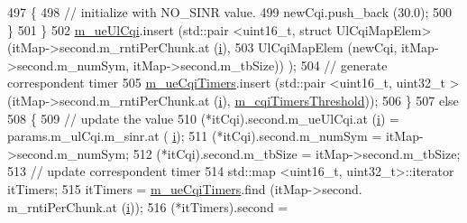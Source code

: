 \begin{DoxyCode}
497                                                 \{
498                                                         \textcolor{comment}{// initialize with NO\_SINR value.}
499                                                         newCqi.push\_back (30.0);
500                                                 \}
501                                         \}
502                                         \hyperlink{classns3_1_1MmWaveFlexTtiMaxWeightMacScheduler_ab984a5ab7fb627aa66aac421719362c9}{m\_ueUlCqi}.insert (std::pair <uint16\_t, struct
       UlCqiMapElem> (itMap->second.m\_rntiPerChunk.at (\hyperlink{bernuolliDistribution_8m_a6f6ccfcf58b31cb6412107d9d5281426}{i}),
503                                                                                                      
      UlCqiMapElem (newCqi, itMap->second.m\_numSym, itMap->second.m\_tbSize)) );
504                                         \textcolor{comment}{// generate correspondent timer}
505                                         \hyperlink{classns3_1_1MmWaveFlexTtiMaxWeightMacScheduler_a34da580592c7aae7c3b6e680728f0057}{m\_ueCqiTimers}.insert (std::pair <uint16\_t, uint32\_t > 
      (itMap->second.m\_rntiPerChunk.at (\hyperlink{bernuolliDistribution_8m_a6f6ccfcf58b31cb6412107d9d5281426}{i}), \hyperlink{classns3_1_1MmWaveFlexTtiMaxWeightMacScheduler_a12853e0079042ba54793594532d1ef15}{m\_cqiTimersThreshold}));
506                                 \}
507                                 \textcolor{keywordflow}{else}
508                                 \{
509                                         \textcolor{comment}{// update the value}
510                                         (*itCqi).second.m\_ueUlCqi.at (\hyperlink{bernuolliDistribution_8m_a6f6ccfcf58b31cb6412107d9d5281426}{i}) = params.m\_ulCqi.m\_sinr.at (
      \hyperlink{bernuolliDistribution_8m_a6f6ccfcf58b31cb6412107d9d5281426}{i});
511                                         (*itCqi).second.m\_numSym = itMap->second.m\_numSym;
512                                         (*itCqi).second.m\_tbSize = itMap->second.m\_tbSize;
513                                         \textcolor{comment}{// update correspondent timer}
514                                         std::map <uint16\_t, uint32\_t>::iterator itTimers;
515                                         itTimers = \hyperlink{classns3_1_1MmWaveFlexTtiMaxWeightMacScheduler_a34da580592c7aae7c3b6e680728f0057}{m\_ueCqiTimers}.find (itMap->second.
      m\_rntiPerChunk.at (\hyperlink{bernuolliDistribution_8m_a6f6ccfcf58b31cb6412107d9d5281426}{i}));
516                                         (*itTimers).second = 

\end{DoxyCode}
